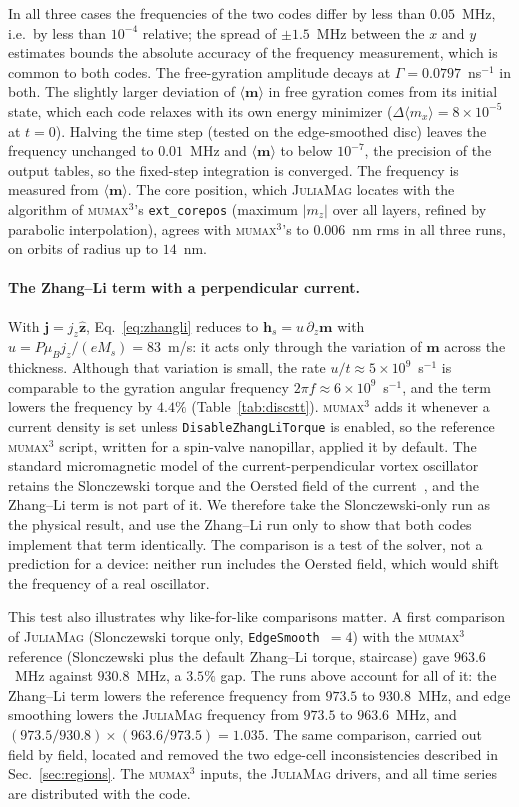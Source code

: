 \documentclass{article}      %
\newcommand{\JuliaMag}{\textsc{JuliaMag}}
\newcommand{\mumax}{\textsc{mumax}$^3$}
\newcommand{\vm}{\bm{m}}
\begin{document}
In all three cases the frequencies of the two codes differ by less than
$0.05$~MHz, i.e.\ by less than $10^{-4}$ relative; the spread of
$\pm1.5$~MHz between the $x$ and $y$ estimates bounds the absolute accuracy
of the frequency measurement, which is common to both codes. The free-gyration
amplitude decays at $\Gamma = 0.0797$~ns$^{-1}$ in both. The slightly larger
deviation of $\langle\vm\rangle$ in free gyration comes from its initial state,
which each code relaxes with its own energy minimizer
($\Delta\langle m_x\rangle = 8\times10^{-5}$ at $t=0$). Halving the time step
(tested on the edge-smoothed disc) leaves the frequency unchanged to
$0.01$~MHz and $\langle\vm\rangle$ to below $10^{-7}$, the precision of the
output tables, so the fixed-step integration is converged. The frequency is
measured from $\langle\vm\rangle$. The core position, which \JuliaMag{} locates
with the algorithm of \mumax's \texttt{ext\_corepos} (maximum $|m_z|$ over all
layers, refined by parabolic interpolation), agrees with \mumax's to
$0.006$~nm rms in all three runs, on orbits of radius up to $14$~nm.

\paragraph{The Zhang--Li term with a perpendicular current.}
With $\bm{j} = j_z\hat{\bm{z}}$, Eq.~\eqref{eq:zhangli} reduces to
$\bm{h}_s = u\,\partial_z\vm$ with $u = P\mu_Bj_z/(eM_s) = 83$~m/s: it acts only
through the variation of $\vm$ across the thickness. Although that variation is
small, the rate $u/t \approx 5\times10^{9}$~s$^{-1}$ is comparable to the
gyration angular frequency $2\pi f\approx6\times10^{9}$~s$^{-1}$, and the term
lowers the frequency by $4.4\%$ (Table~\ref{tab:discstt}). \mumax{} adds it
whenever a current density is set unless \texttt{DisableZhangLiTorque} is
enabled, so the reference \mumax{} script, written for a spin-valve
nanopillar, applied it by default. The standard micromagnetic model of the
current-perpendicular vortex oscillator retains the Slonczewski torque and the
Oersted field of the current~\cite{khvalkovskiy2009}, and the Zhang--Li term
is not part of it. We therefore take the Slonczewski-only run as the physical
result, and use the Zhang--Li run only to show that both codes implement that
term identically. The comparison is a test of the solver, not a prediction for
a device: neither run includes the Oersted field, which would shift the
frequency of a real oscillator.

This test also illustrates why like-for-like comparisons matter. A first
comparison of \JuliaMag{} (Slonczewski torque only, \texttt{EdgeSmooth}~$=4$)
with the \mumax{} reference (Slonczewski plus the default Zhang--Li torque,
staircase) gave $963.6$~MHz against $930.8$~MHz, a $3.5\%$ gap. The runs
above account for all of it: the Zhang--Li term lowers the reference frequency
from $973.5$ to $930.8$~MHz, and edge smoothing lowers the \JuliaMag{}
frequency from $973.5$ to $963.6$~MHz, and
$(973.5/930.8)\times(963.6/973.5) = 1.035$. The same comparison, carried out
field by field, located and removed the two edge-cell inconsistencies described
in Sec.~\ref{sec:regions}. The \mumax{} inputs, the \JuliaMag{} drivers, and all
time series are distributed with the code.
\end{document}
